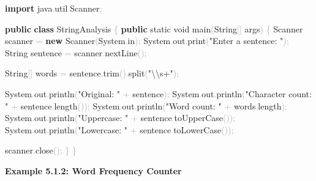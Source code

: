 \documentclass[
  justified,
  openright,
]{tufte-book}
\newcommand{\KeywordTok}[1]{\textcolor{CodeKeyword}{\textbf{#1}}}  %
\newcommand{\StringTok}[1]{\textcolor{CodeString}{#1}}              %
\newcommand{\CodeFuncTok}[1]{\textcolor{CodeKeyword}{#1}}           %
\newcommand{\CodeTypeTok}[1]{\textcolor{CodeType}{#1}}              %
\newcommand{\CodeAccentTok}[1]{\textcolor{CodeAccent}{#1}}          %
\newcommand{\OperatorTok}[1]{\textcolor{DarkGray}{#1}}              %
\newenvironment{Shaded}{%
  \begin{mdframed}[style=TufteCode]%
}{%
  \end{mdframed}%
}
\begin{document}
\begin{Shaded}
\begin{Highlighting}[]
\KeywordTok{import} \CodeAccentTok{java}\OperatorTok{.}\CodeAccentTok{util}\OperatorTok{.}\CodeAccentTok{Scanner}\OperatorTok{;}
 
\KeywordTok{public} \KeywordTok{class} StringAnalysis \OperatorTok{\{}
    \KeywordTok{public} \CodeTypeTok{static} \CodeTypeTok{void} \CodeFuncTok{main}\OperatorTok{(}String\OperatorTok{[]} args\OperatorTok{)} \OperatorTok{\{}
        Scanner scanner \OperatorTok{=} \KeywordTok{new} Scanner\OperatorTok{(}System\OperatorTok{.}\CodeFuncTok{in}\OperatorTok{);}
        System\OperatorTok{.}\CodeFuncTok{out}\OperatorTok{.}\CodeFuncTok{print}\OperatorTok{(}\StringTok{"Enter a sentence: "}\OperatorTok{);}
        String sentence \OperatorTok{=} scanner\OperatorTok{.}\CodeFuncTok{nextLine}\OperatorTok{();}
 
        String\OperatorTok{[]} words \OperatorTok{=} sentence\OperatorTok{.}\CodeFuncTok{trim}\OperatorTok{().}\CodeFuncTok{split}\OperatorTok{(}\StringTok{"}\StringTok{\textbackslash{}\textbackslash{}}\StringTok{s+"}\OperatorTok{);}
 
        System\OperatorTok{.}\CodeFuncTok{out}\OperatorTok{.}\CodeFuncTok{println}\OperatorTok{(}\StringTok{"Original: "} \OperatorTok{+} sentence\OperatorTok{);}
        System\OperatorTok{.}\CodeFuncTok{out}\OperatorTok{.}\CodeFuncTok{println}\OperatorTok{(}\StringTok{"Character count: "} \OperatorTok{+} sentence\OperatorTok{.}\CodeFuncTok{length}\OperatorTok{());}
        System\OperatorTok{.}\CodeFuncTok{out}\OperatorTok{.}\CodeFuncTok{println}\OperatorTok{(}\StringTok{"Word count: "} \OperatorTok{+} words\OperatorTok{.}\CodeFuncTok{length}\OperatorTok{);}
        System\OperatorTok{.}\CodeFuncTok{out}\OperatorTok{.}\CodeFuncTok{println}\OperatorTok{(}\StringTok{"Uppercase: "} \OperatorTok{+} sentence\OperatorTok{.}\CodeFuncTok{toUpperCase}\OperatorTok{());}
        System\OperatorTok{.}\CodeFuncTok{out}\OperatorTok{.}\CodeFuncTok{println}\OperatorTok{(}\StringTok{"Lowercase: "} \OperatorTok{+} sentence\OperatorTok{.}\CodeFuncTok{toLowerCase}\OperatorTok{());}
 
        scanner\OperatorTok{.}\CodeFuncTok{close}\OperatorTok{();}
    \OperatorTok{\}}
\OperatorTok{\}}
\end{Highlighting}
\end{Shaded}

\textbf{Example 5.1.2: Word Frequency Counter}
\end{document}
